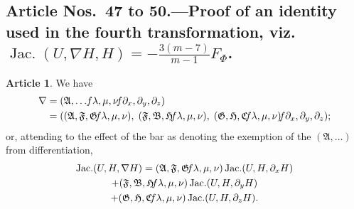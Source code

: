 \documentclass[12pt,a4paper]{article}
\theoremstyle{definition}
\newtheorem{art}{Article}[section]
\DeclareMathOperator{\Jac}{Jac.}
\begin{document}
\subsection*{Article Nos.\ 47 to 50.---Proof of an identity used in the fourth transformation, viz. $\Jac(U, \nabla H, H) = -\frac{3(m - 7)}{m - 1}F_\Phi$.}

\begin{art}
We have
\begin{align*}
\nabla &= (\mathfrak{A}, \ldots \hspace{-2pt} f\lambda, \mu, \nu \hspace{-2pt} f\partial_x, \partial_y, \partial_z) \\
&= ((\mathfrak{A}, \mathfrak{F}, \mathfrak{G} \hspace{-2pt} f\lambda, \mu, \nu), \; (\mathfrak{F}, \mathfrak{B}, \mathfrak{H} \hspace{-2pt} f\lambda, \mu, \nu), \; (\mathfrak{G}, \mathfrak{H}, \mathfrak{C} \hspace{-2pt} f\lambda, \mu, \nu) \hspace{-2pt} f\partial_x, \partial_y, \partial_z);
\end{align*}
or, attending to the effect of the bar as denoting the exemption of the $(\mathfrak{A}, \ldots)$ from differentiation,
\begin{multline*}
\Jac(U, H, \nabla H) = (\mathfrak{A}, \mathfrak{F}, \mathfrak{G} \hspace{-2pt} f\lambda, \mu, \nu)\Jac(U, H, \partial_x H) \\
+ (\mathfrak{F}, \mathfrak{B}, \mathfrak{H} \hspace{-2pt} f\lambda, \mu, \nu)\Jac(U, H, \partial_y H) \\
+ (\mathfrak{G}, \mathfrak{H}, \mathfrak{C} \hspace{-2pt} f\lambda, \mu, \nu)\Jac(U, H, \partial_z H).
\end{multline*}
\end{art}
\end{document}
